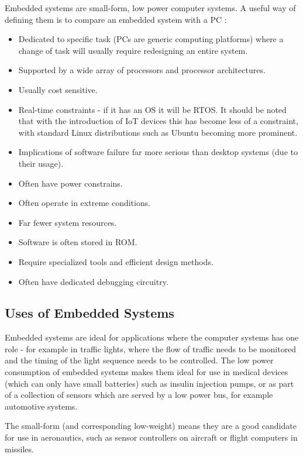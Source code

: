 Embedded systems are small-form, low power computer systems. A useful way of defining them is to compare an embedded system with a PC \cite{BergerArnold2002Esd:}:
\begin{itemize}
\item Dedicated to specific task (PCs are generic computing platforms) where a change of task will usually require redesigning an entire system.
\item Supported by a wide array of processors and processor architectures.
\item Usually cost sensitive.
\item Real-time constraints - if it has an OS it will be RTOS. It should be noted that with the introduction of IoT devices this has become less of a constraint, with standard Linux distributions such as Ubuntu becoming more prominent.
\item Implications of software failure far more serious than desktop systems (due to their usage).
\item Often have power constrains.
\item Often operate in extreme conditions.
\item Far fewer system resources.
\item Software is often stored in ROM.
\item Require specialized tools and efficient design methods.
\item Often have dedicated debugging circuitry.
\end{itemize}

\subsection{Uses of Embedded Systems}\label{usesEmbeddedSystems}

Embedded systems are ideal for applications where the computer systems has one role - for example in traffic lights, where the flow of traffic needs to be monitored and the timing of the light sequence needs to be controlled. The low power consumption of embedded systems makes them ideal for use in medical devices (which can only have small batteries) such as insulin injection pumps, or as part of a collection of sensors which are served by a low power bus, for example automotive systems.

The small-form (and corresponding low-weight) means they are a good candidate for use in aeronautics, such as sensor controllers on aircraft or flight computers in missiles.

